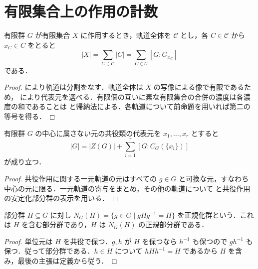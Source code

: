 \section{有限集合上の作用の計数}
\begin{prop}[有限集合の軌道分解公式]
有限群 $G$ が有限集合 $X$ に作用するとき，軌道全体を $\mathcal C$ とし，各 $C\in\mathcal C$ から $x_C\in C$ をとると
\[
 |X|=\sum_{C\in\mathcal C}|C|
      =\sum_{C\in\mathcal C}[G:G_{x_C}]
\]
である．
\end{prop}
\begin{proof}
 により軌道は分割をなす．軌道全体は $X$ の写像による像で有限であるため， により代表元を選べる．有限個の互いに素な有限集合の合併の濃度は各濃度の和であることは  と帰納法による．各軌道について前命題を用いれば第二の等号を得る．
\end{proof}
\begin{prop}[類等式]
有限群 $G$ の中心に属さない元の共役類の代表元を $x_1,\ldots,x_r$ とすると
\[
 |G|=|Z(G)|+\sum_{i=1}^{r}[G:C_G(\{x_i\})]
\]
が成り立つ．
\end{prop}
\begin{proof}
共役作用に関する一元軌道の元はすべての $g\in G$ と可換な元，すなわち中心の元に限る．一元軌道の寄与をまとめ，その他の軌道について  と共役作用の安定化部分群の表示を用いる．
\end{proof}
\begin{defn}[正規化群]
部分群 $H\subseteq G$ に対し $N_G(H)=\{g\in G\mid gHg^{-1}=H\}$ を正規化群という．これは $H$ を含む部分群であり，$H$ は $N_G(H)$ の正規部分群である．
\end{defn}
\begin{proof}
単位元は $H$ を共役で保つ．$g,h$ が $H$ を保つなら $h^{-1}$ も保つので $gh^{-1}$ も保つ．従って部分群である．$h\in H$ について $hHh^{-1}=H$ であるから $H$ を含み，最後の主張は定義から従う．
\end{proof}
